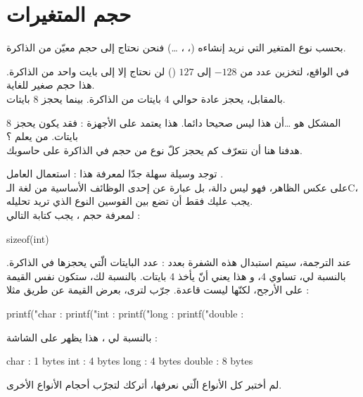\section{حجم المتغيرات}

بحسب نوع المتغير التي نريد إنشاءه
(،
،
 \dots)
فنحن نحتاج إلى حجم معيّن من الذاكرة.

في الواقع، لتخزين عدد من
$-128$
إلى
$127$
()
لن نحتاج إلا إلى بايت واحد من الذاكرة. هذا حجم صغير للغاية.\\
بالمقابل،
يحجز عادة حوالي 4 بايتات من الذاكرة. بينما
يحجز 8 بايتات.

المشكل هو \dots أن هذا ليس  صحيحا دائما. هذا يعتمد على الأجهزة : فقد يكون
يحجز 8 بايتات. من يعلم ؟\\
هدفنا هنا أن نتعرّف كم يحجز كلّ نوع من حجم في الذاكرة على حاسوبك.

توجد وسيلة سهلة جدّا لمعرفة هذا : استعمال العامل
.\\
على عكس الظاهر، فهو ليس دالة، بل عبارة عن إحدى الوظائف الأساسية من لغة الـ\textenglish{C}،
يجب عليك فقط أن تضع بين القوسين النوع الذي تريد تحليله.\\
لمعرفة حجم
،
يجب كتابة التالي :

\begin{Csource}
sizeof(int)
\end{Csource}

عند الترجمة، سيتم استبدال هذه الشفرة بعدد : عدد البايتات الّتي يحجزها
في الذاكرة. بالنسبة لي،
تساوي 4، و هذا يعني أنّ
يأخذ 4 بايتات. بالنسبة لك، ستكون نفس القيمة على الأرجح، لكنّها ليست قاعدة. جرّب لترى، بعرض القيمة عن طريق
مثلا :

\begin{Csource}
printf("char : %
printf("int : %
printf("long : %
printf("double : %
\end{Csource}

بالنسبة لي ، هذا يظهر على الشاشة :

\begin{Console}
char : 1 bytes
int : 4 bytes
long : 4 bytes
double : 8 bytes
\end{Console}

لم أختبر كل الأنواع الّتي نعرفها، أتركك لتجرّب أحجام الأنواع الأخرى.

